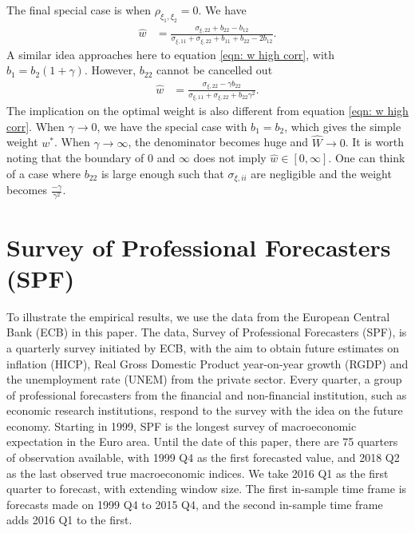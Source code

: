 \documentclass[11pt]{article}
\begin{document}
The final special case is when $\rho_{\xi_1,\xi_2}=0$. We have
\begin{equation}
\begin{aligned}
\hat{w} &= \frac{\sigma_{\xi,22}+b_{22}-b_{12}}{\sigma_{\xi,11}+\sigma_{\xi,22}+b_{11}+b_{22}-2b_{12}}.
\end{aligned}
\end{equation}
A similar idea approaches here to equation \ref{eqn: w high corr}, with $b_1 = b_2 (1+\gamma)$. However, $b_{22}$ cannot be cancelled out
\begin{equation}
\begin{aligned}
\hat{w} &= \frac{\sigma_{\xi,22}-\gamma b_{22}}{\sigma_{\xi,11}+\sigma_{\xi,22}+b_{22}\gamma^2}.
\end{aligned}
\end{equation}
The implication on the optimal weight is also different from equation \ref{eqn: w high corr}. When $\gamma \to 0$, we have the special case with $b_1=b_2$, which gives the simple weight $w^*$. When $\gamma \to \infty$, the denominator becomes huge and $\hat{W} \to 0$. It is worth noting that the boundary of 0 and $\infty$ does not imply $\hat{w} \in [0,\infty]$. One can think of a case where $b_{22}$ is large enough such that $\sigma_{\xi,ii}$ are negligible and the weight becomes $\frac{-\gamma}{\gamma^2}$. 



\section{Survey of Professional Forecasters (SPF)}\label{survey-of-professional-forecasters-spf}

To illustrate the empirical results, we use the data from the European Central Bank (ECB) in this paper. The data, Survey of Professional Forecasters (SPF), is a quarterly survey initiated by ECB, with the aim to obtain future estimates on inflation (HICP), Real Gross Domestic Product year-on-year growth (RGDP) and the unemployment rate (UNEM) from the private sector. Every quarter, a group of professional forecasters from the financial and non-financial institution, such as economic research institutions, respond to the survey with the idea on the future economy. Starting in 1999, SPF is the longest survey of macroeconomic expectation in the Euro area. Until the date of this paper, there are 75 quarters of observation available, with 1999 Q4 as the first forecasted value, and 2018 Q2 as the last observed true macroeconomic indices. We take 2016 Q1 as the first quarter to forecast, with extending window size. The first in-sample time frame is forecasts made on 1999 Q4 to 2015 Q4, and the second in-sample time frame adds 2016 Q1 to the first.
\end{document}
